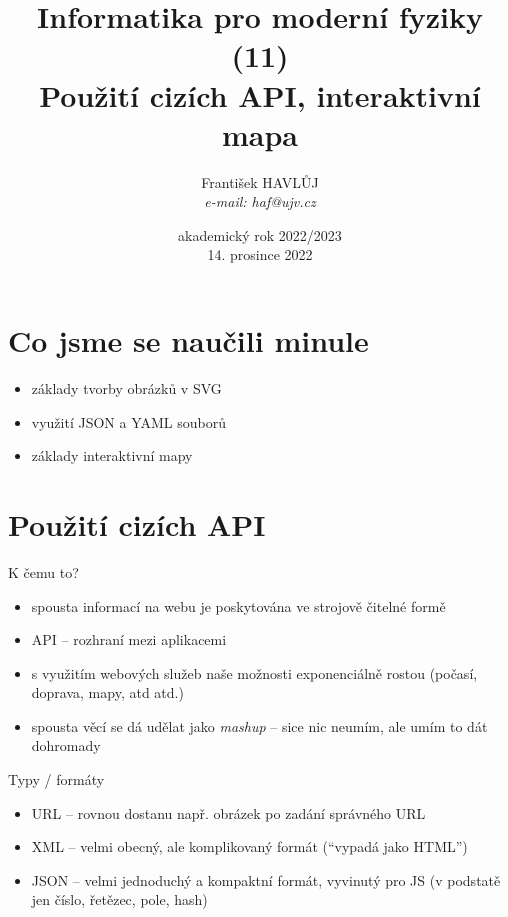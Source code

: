 \documentclass{beamer}
\title[IMF (11)]{Informatika pro moderní fyziky (11)\\ Použití cizích API, interaktivní mapa}
\author[Franti\v{s}ek HAVL\r{U}J, ORF ÚJV Řež]{Franti\v{s}ek HAVL\r{U}J\\{\scriptsize \emph{e-mail: haf@ujv.cz}}}
\date{akademický rok 2022/2023\\14. prosince 2022}
\institute[ORF ÚJV Řež]
{ÚJV Řež\\oddělení Reaktorové fyziky a podpory palivového cyklu}
\begin{document}
\begin{frame}
  \titlepage
\end{frame}

\begin{frame}
  \tableofcontents
\end{frame}

\section{Co jsme se naučili minule}

\begin{frame}{}
  \begin{itemize}
    \item základy tvorby obrázků v SVG
    \item využití JSON a YAML souborů
    \item základy interaktivní mapy
  \end{itemize}
\end{frame}


\section{Použití cizích API}

\begin{frame}{K čemu to?}
  \begin{itemize}
    \item spousta informací na webu je poskytována ve strojově čitelné formě
    \item API -- rozhraní mezi aplikacemi
    \item s využitím webových služeb naše možnosti exponenciálně rostou (počasí, doprava, mapy, atd atd.)
    \item spousta věcí se dá udělat jako \emph{mashup} -- sice nic neumím, ale umím to dát dohromady
  \end{itemize}
\end{frame}


\begin{frame}{Typy / formáty}
  \begin{itemize}
    \item URL -- rovnou dostanu např. obrázek po zadání správného URL
    \item XML -- velmi obecný, ale komplikovaný formát (``vypadá jako HTML'')
    \item JSON -- velmi jednoduchý a kompaktní formát, vyvinutý pro JS (v podstatě jen číslo, řetězec, pole, hash)
  \end{itemize}
\end{frame}
\end{document}
